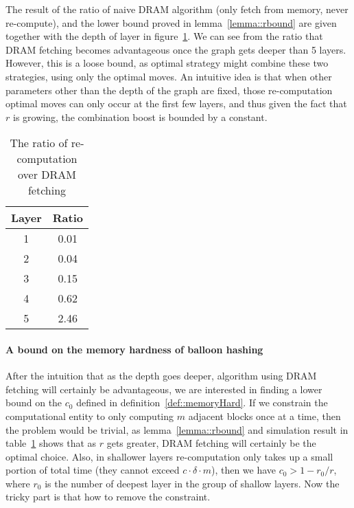 The result of the ratio of naive DRAM algorithm (only fetch from memory, never re-compute), and
the lower bound proved in lemma~\ref{lemma::rbound} are given together with the depth of layer in
figure~\ref{table::recompDramRatio}. We can see from the ratio that DRAM fetching becomes advantageous once the
graph gets deeper than 5 layers. However, this is a loose bound, as optimal strategy might combine these two strategies,
using only the optimal moves. An intuitive idea is that when other parameters other than the depth of the graph are fixed,
those re-computation optimal moves can only occur at the first few layers, and thus given the fact that $r$ is growing,
the combination boost is bounded by a constant.

\begin{table}
  \centering
  \begin{tabular}{|c|c|}
     \hline
     Layer & Ratio \\ \hline
     1 & 0.01 \\
     2 & 0.04 \\
     3 & 0.15 \\
     4 & 0.62 \\
     5 & 2.46 \\
     \hline
  \end{tabular}
  \caption{The ratio of re-computation over DRAM fetching}\label{table::recompDramRatio}
\end{table}

\paragraph{A bound on the memory hardness of balloon hashing}
After the intuition that as the depth goes deeper, algorithm using DRAM fetching will certainly be advantageous, we are interested in
finding a lower bound on the $c_0$ defined in definition~\ref{def::memoryHard}. If we constrain the computational entity to only computing
$m$ adjacent blocks once at a time, then the problem would be trivial, as lemma~\ref{lemma::rbound} and simulation result in table~\ref{table::recompDramRatio}
shows that as $r$ gets greater, DRAM fetching will certainly be the optimal choice. Also, in shallower layers re-computation only takes up a
small portion of total time (they cannot exceed $c \cdot \delta \cdot m$), then we have $c_0 > 1 - r_0/r$, where $r_0$ is the number of deepest layer in
the group of shallow layers. Now the tricky part is that how to remove the constraint.

